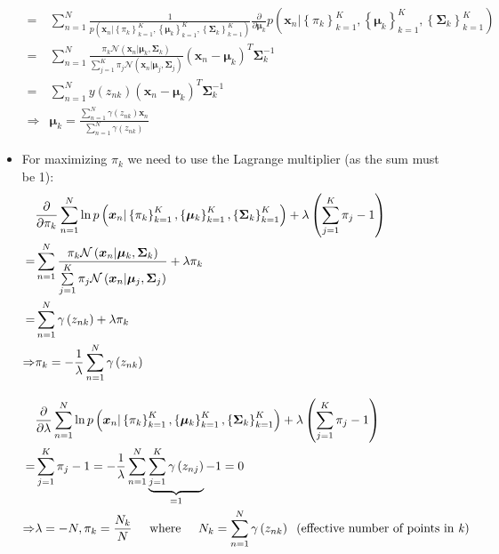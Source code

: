 \begin{itemize}
\begin{equation*}
\begin{split}
			= & \sum\limits_{n=1}^{N} \frac{1}{ p\left(\bm{x}_n|\left\{\pi_k\right\}_{k=1}^{K}, \left\{\bm{\mu}_k\right\}_{k=1}^{K}, \left\{\bm{\Sigma}_k\right\}_{k=1}^{K}\right)} \frac{\partial}{\partial \bm{\mu}_k} p\left(\bm{x}_n|\left\{\pi_k\right\}_{k=1}^{K}, \left\{\bm{\mu}_k\right\}_{k=1}^{K}, \left\{\bm{\Sigma}_k\right\}_{k=1}^{K}\right)\\
			= & \sum\limits_{n=1}^{N} \frac{\pi_k \mathcal{N}\left(\bm{x}_n|\bm{\mu}_k, \bm{\Sigma}_k\right)}{\sum\limits_{j=1}^{K}\pi_j \mathcal{N}\left(\bm{x}_n|\bm{\mu}_j, \bm{\Sigma}_j\right)} \left(\bm{x}_n - \bm{\mu}_k\right)^T\bm{\Sigma}_k^{-1}\\
			= & \sum\limits_{n=1}^{N} y\left(z_{nk}\right) \left(\bm{x}_n - \bm{\mu}_k\right)^T\bm{\Sigma}_k^{-1}\\
			\Rightarrow & \bm{\mu}_k = \frac{\sum_{n=1}^{N}\gamma\left(z_{nk}\right)\bm{x}_n}{\sum_{n=1}^{N}\gamma\left(z_{nk}\right)}
		\end{split}
	\end{equation*}
	\item For maximizing $\pi_k$ we need to use the Lagrange multiplier (as the sum must be 1):
	\begin{equation*}
		\begin{split}
			& \frac{\partial}{\partial \pi_k} \sum\limits_{n=1}^{N} \ln p\left(\bm{x}_n|\left\{\pi_k\right\}_{k=1}^{K}, \left\{\bm{\mu}_k\right\}_{k=1}^{K}, \left\{\bm{\Sigma}_k\right\}_{k=1}^{K}\right) + \lambda \left(\sum\limits_{j=1}^{K}\pi_j - 1\right)\\
			= & \sum\limits_{n=1}^{N} \frac{\pi_k \mathcal{N}\left(\bm{x}_n|\bm{\mu}_k, \bm{\Sigma}_k\right)}{\sum\limits_{j=1}^{K}\pi_j \mathcal{N}\left(\bm{x}_n|\bm{\mu}_j, \bm{\Sigma}_j\right)} + \lambda \pi_k\\
			= & \sum\limits_{n=1}^{N} \gamma\left(z_{nk}\right) + \lambda \pi_k\\
			\Rightarrow & \pi_k = -\frac{1}{\lambda}\sum\limits_{n=1}^{N} \gamma\left(z_{nk}\right)\\[10pt]
			& \frac{\partial}{\partial \lambda} \sum\limits_{n=1}^{N} \ln p\left(\bm{x}_n|\left\{\pi_k\right\}_{k=1}^{K}, \left\{\bm{\mu}_k\right\}_{k=1}^{K}, \left\{\bm{\Sigma}_k\right\}_{k=1}^{K}\right) + \lambda \left(\sum\limits_{j=1}^{K}\pi_j - 1\right)\\
			= & \sum\limits_{j=1}^{K}\pi_j - 1 = -\frac{1}{\lambda}\sum\limits_{n=1}^{N} \underbrace{\sum\limits_{j=1}^{K}\gamma\left(z_{nj}\right)}_{=1} - 1 = 0\\
			\Rightarrow & \lambda = -N, \pi_k = \frac{N_k}{N} \text{\hspace{5mm}where\hspace{5mm}} N_k = \sum\limits_{n=1}^{N} \gamma\left(z_{nk}\right) \text{\hspace{2mm}(effective number of points in \textit{k})}

\end{split}
\end{equation*}
\end{itemize}
